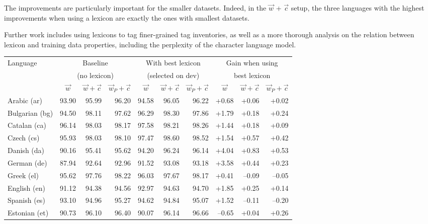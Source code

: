 \documentclass[11pt,letterpaper]{article}
\begin{document}
The improvements are particularly important for the smaller datasets. Indeed, in the $\vec{w}$ + $\vec{c}$ setup, the three languages with the highest improvements when using a lexicon are exactly the ones with smallest datasets.

Further work includes using lexicons to tag finer-grained tag inventories, as well as a more thorough analysis on the relation between lexicon and training data properties, including the perplexity of the character language model.

\begin{table}
\centering\scriptsize
\begin{tabular}{l|rrr|rrr|rrr}
\toprule
Language & \multicolumn{3}{c}{Baseline} & \multicolumn{3}{c}{With best lexicon} & \multicolumn{3}{c}{Gain when using} \\
 & \multicolumn{3}{c}{(no lexicon)} & \multicolumn{3}{c}{(selected on dev)} & \multicolumn{3}{c}{best lexicon} \\
 & \multicolumn{1}{c}{$\vec{w}$} & \multicolumn{1}{c}{$\vec{w}+\vec{c}$} & \multicolumn{1}{c}{$\vec{w}_P+\vec{c}$} & \multicolumn{1}{c}{$\vec{w}$} & \multicolumn{1}{c}{$\vec{w}+\vec{c}$} & \multicolumn{1}{c}{$\vec{w}_P+\vec{c}$} & \multicolumn{1}{c}{$\vec{w}$} & \multicolumn{1}{c}{$\vec{w}+\vec{c}$} & \multicolumn{1}{c}{$\vec{w}_P+\vec{c}$} \\
\midrule
Arabic (ar) & 93.90 & 95.99 & 96.20 & 94.58 & 96.05 & 96.22 & +0.68 & +0.06 & +0.02\\
Bulgarian (bg) & 94.50 & 98.11 & 97.62 & 96.29 & 98.30 & 97.86 & +1.79 & +0.18 & +0.24\\
Catalan (ca) & 96.14 & 98.03 & 98.17 & 97.58 & 98.21 & 98.26 & +1.44 & +0.18 & +0.09\\
Czech (cs) & 95.93 & 98.03 & 98.10 & 97.47 & 98.60 & 98.52 & +1.54 & +0.57 & +0.42\\
Danish (da) & 90.16 & 95.41 & 95.62 & 94.20 & 96.24 & 96.14 & +4.04 & +0.83 & +0.53\\
German (de) & 87.94 & 92.64 & 92.96 & 91.52 & 93.08 & 93.18 & +3.58 & +0.44 & +0.23\\
Greek (el) & 95.62 & 97.76 & 98.22 & 96.03 & 97.67 & 98.17 & +0.41 & --0.09 & --0.05\\
English (en) & 91.12 & 94.38 & 94.56 & 92.97 & 94.63 & 94.70 & +1.85 & +0.25 & +0.14\\
Spanish (es) & 93.10 & 94.96 & 95.27 & 94.62 & 94.84 & 95.07 & +1.52 & --0.11 & --0.20\\
Estonian (et) & 90.73 & 96.10 & 96.40 & 90.07 & 96.14 & 96.66 & --0.65 & +0.04 & +0.26\\

\end{tabular}
\end{table}
\end{document}
